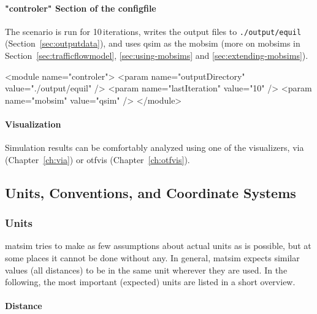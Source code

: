 \paragraph{"controler" Section of the \protect\gls{configfile}}

The scenario is run for 10\,iterations, writes the output files to \lstinline|./output/equil| (Section~\ref{sec:outputdata}), and uses \gls{qsim} as the \gls{mobsim} (more on \glspl{mobsim} in Section~\ref{sec:trafficflowmodel}, \ref{sec:using-mobsims} and \ref{sec:extending-mobsims}).
\begin{xml}
<module name="controler">
	<param name="outputDirectory" value="./output/equil" />
	<param name="lastIteration" value="10" />
	<param name="mobsim" value="qsim" />	
</module>
\end{xml}


\paragraph{Visualization}

Simulation results can be comfortably analyzed using one of the visualizers, \gls{via} (Chapter~\ref{ch:via}) or \gls{otfvis} (Chapter~\ref{ch:otfvis}).

\subsection{Units, Conventions, and Coordinate Systems}
\label{sec:unitsconventions}
\subsubsection{Units}
\gls{matsim} tries to make as few assumptions about actual units as is possible, but at some places it cannot be done without any. In general, \gls{matsim} expects similar values (\eg all distances) to be in the same unit wherever they are used. In the following, the most important (expected) units are listed in a short overview. 

\paragraph{Distance}

